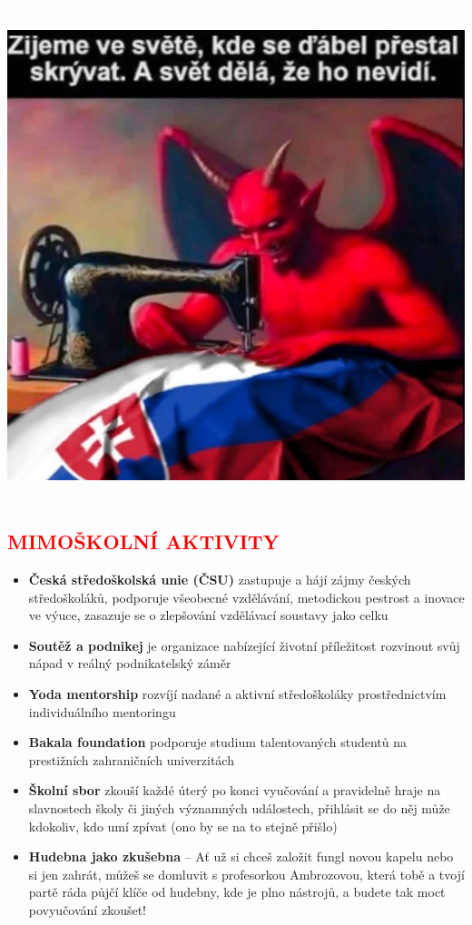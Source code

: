 \documentclass{article}
\newcommand{\podnadpis}[1]{
  \subsection*{\textcolor{red}{#1}}
}
\begin{document}
\begin{redbox}
\begin{minipage}{0.32\linewidth}
    \centering \textcolor{white}{aa}
  \end{minipage}
  \hfill
  \begin{minipage}{0.32\linewidth}
    \includegraphics[width=\linewidth]{dulezite.jpg}
    \centering \textcolor{white}{aa}
  \end{minipage}
\end{redbox}

\podnadpis{MIMOŠKOLNÍ AKTIVITY}
\begin{itemize}[leftmargin=10pt]
  \item \textbf{Česká středoškolská unie (ČSU)} zastupuje a hájí zájmy českých středoškoláků,  podporuje všeobecné vzdělávání, metodickou pestrost a inovace ve výuce, zasazuje se o zlepšování vzdělávací soustavy jako celku
  \item \textbf{Soutěž a podnikej} je organizace nabízející životní příležitost rozvinout svůj nápad v reálný podnikatelský záměr
  \item \textbf{Yoda mentorship} rozvíjí nadané a aktivní středoškoláky prostřednictvím individuálního mentoringu
  \item \textbf{Bakala foundation} podporuje studium talentovaných studentů na prestižních zahraničních univerzitách
  \item \textbf{Školní sbor} zkouší každé úterý po konci vyučování a pravidelně hraje na slavnostech školy či jiných významných událostech, přihlásit se do něj může kdokoliv, kdo umí zpívat (ono by se na to stejně přišlo)
  \item \textbf{Hudebna jako zkušebna} -- Ať už si chceš založit fungl novou kapelu nebo si jen zahrát, můžeš se domluvit s profesorkou Ambrozovou, která tobě a tvojí partě ráda půjčí klíče od hudebny, kde je plno nástrojů, a budete tak moct povyučování zkoušet!
\end{itemize}
\end{document}
